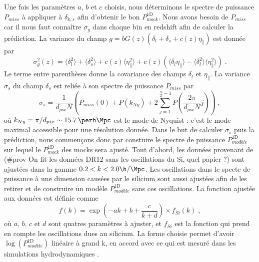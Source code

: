 \documentclass[11pt, twoside, a4paper, openright]{report}
\begin{document}
Une fois les paramètres $a$, $b$ et $c$ choisis, nous déterminons le spectre de puissance $P_{miss}$ à appliquer à $\delta_{k,s}$ afin d'obtenir le bon $P_{mock}^{\mathrm{1D}}$.
Nous avons besoin de $P_{miss}$ car il nous faut connaître $\sigma_g$ dans chaque bin en redshift afin de calculer la prédiction.
La variance du champ $g = b G(z)(\delta_l + \delta_s + c(z)\eta_{\parallel})$ est donnée par
\begin{equation}
  \label{eq:sigma_g}
  \sigma_g^2(z) = \langle \delta_l^2 \rangle + \langle \delta_s^2 \rangle + c(z) \langle \eta_{\parallel}^2 \rangle +
  c(z) \left( \langle \delta_l \eta_{\parallel} \rangle - \langle \delta_l^2 \rangle \langle \eta_{\parallel}^2 \rangle \right)\; .
\end{equation}
Le terme entre parenthèses donne la covariance des champs $\delta_l$ et $\eta_{\parallel}$. La variance $\sigma_s$ du champ $\delta_s$ est reliée à son spectre de puissance $P_{miss}$ par
\begin{equation}
  \sigma_s = \frac{1}{d_{pix}N} \left( P_{miss}(0) + P(k_{Ny}) + 2 \sum_{j=1}^{\frac{N}{2} - 1}P(\frac{2 \pi}{d_{pix}N} j)\right) \; ,
\end{equation}
où $k_{Ny} = \pi / d_{pix} \sim \SI{15.7}{\perh\Mpc}$ est le mode de Nyquist : c'est le mode maximal accessible pour une résolution donnée.
Dans le but de calculer $\sigma_s$ puis la prédiction,
nous commençons donc par constuire le spectre de puissance $P^{\mathrm{1D}}_{modèle}$ sur lequel le $P_{mock}^{\mathrm{1D}}$ des mocks sera ajusté. Tout d'abord, les données provenant de (\#prov On fit les données DR12 sans les oscillations du Si, quel papier ?) sont ajustées dans la gamme $\num{0.2} < k < {2.0} \si{\h\per\Mpc}$. Les oscillations dans le specte de puissance à une dimension causées par le silicium sont aussi ajustées afin de les retirer et de construire un modèle $P^{\mathrm{1D}}_{modèle}$ sans ces oscillations. La fonction ajustée aux données est définie comme
\begin{equation}
  \label{eq:p1d_data}
  f(k) = \exp(- a k + b + \frac{c}{k + d}) \times f_{Si}(k) \; ,
\end{equation}
où $a$, $b$, $c$ et $d$ sont quatres paramètres à ajuster, et $f_{Si}$ est la fonction qui prend en compte les oscillations dues au silicium. La forme choisie permet d'avoir $\log(P^{\mathrm{1D}}_{modèle})$ linéaire à grand k, en accord avec ce qui est mesuré dans les simulations hydrodynamiques \autocite{Arinyo-i-Prats2015}.
\end{document}
